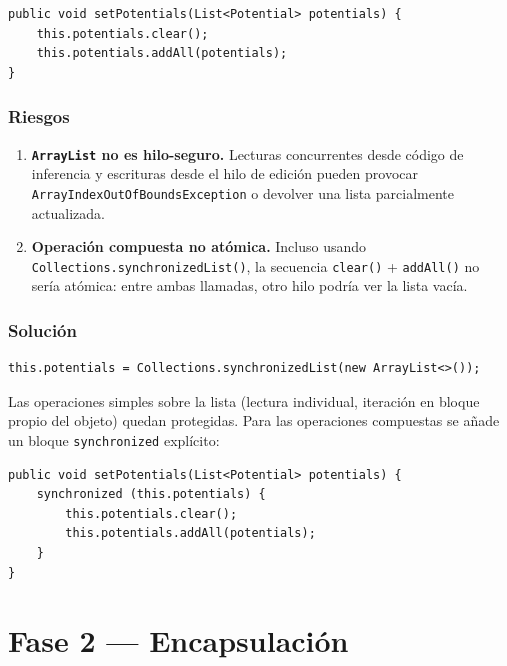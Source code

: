 \documentclass[11pt,a4paper]{article}
\newcommand{\code}[1]{\texttt{#1}}
\begin{document}
\begin{lstlisting}
public void setPotentials(List<Potential> potentials) {
    this.potentials.clear();
    this.potentials.addAll(potentials);
}
\end{lstlisting}

\subsubsection*{Riesgos}

\begin{enumerate}[label=(\alph*)]
  \item \textbf{\code{ArrayList} no es hilo-seguro.}
    Lecturas concurrentes desde código de inferencia y escrituras desde
    el hilo de edición pueden provocar \code{ArrayIndexOutOfBoundsException}
    o devolver una lista parcialmente actualizada.

  \item \textbf{Operación compuesta no atómica.}
    Incluso usando \code{Collections.synchronizedList()}, la secuencia
    \code{clear()} + \code{addAll()} no sería atómica: entre ambas
    llamadas, otro hilo podría ver la lista vacía.
\end{enumerate}

\subsubsection*{Solución}

\begin{lstlisting}
this.potentials = Collections.synchronizedList(new ArrayList<>());
\end{lstlisting}

Las operaciones simples sobre la lista (lectura individual, iteración
en bloque propio del objeto) quedan protegidas. Para las operaciones
compuestas se añade un bloque \code{synchronized} explícito:

\begin{lstlisting}
public void setPotentials(List<Potential> potentials) {
    synchronized (this.potentials) {
        this.potentials.clear();
        this.potentials.addAll(potentials);
    }
}
\end{lstlisting}

\section{Fase 2 --- Encapsulación}
\end{document}
